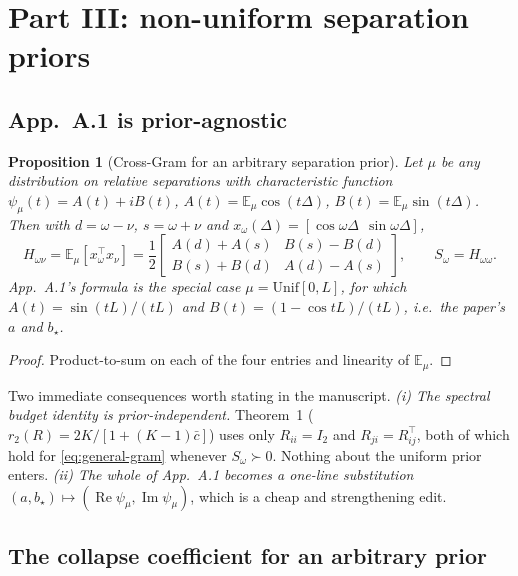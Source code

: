 \documentclass[11pt]{article}
\newtheorem{proposition}[theorem]{Proposition}
\theoremstyle{definition}
\newcommand{\E}{\mathbb{E}}
\begin{document}
\section{Part III: non-uniform separation priors}
\label{sec:prior}

\subsection{App.~A.1 is prior-agnostic}

\begin{proposition}[Cross-Gram for an arbitrary separation prior]\label{prop:cross-gram}
Let $\mu$ be any distribution on relative separations with characteristic function
$\psi_\mu(t)=A(t)+iB(t)$, $A(t)=\E_\mu\cos(t\Delta)$, $B(t)=\E_\mu\sin(t\Delta)$. Then with
$d=\omega-\nu$, $s=\omega+\nu$ and $x_\omega(\Delta)=[\cos\omega\Delta\ \ \sin\omega\Delta]$,
\begin{equation}
H_{\omega\nu}=\E_\mu[x_\omega^\top x_\nu]=\frac12
\begin{bmatrix} A(d)+A(s) & B(s)-B(d)\\ B(s)+B(d) & A(d)-A(s)\end{bmatrix},
\qquad S_\omega=H_{\omega\omega}.
\label{eq:general-gram}
\end{equation}
App.~A.1's formula is the special case $\mu=\mathrm{Unif}[0,L]$, for which
$A(t)=\sin(tL)/(tL)$ and $B(t)=(1-\cos tL)/(tL)$, i.e.\ the paper's $a$ and $b_\star$.
\end{proposition}
\begin{proof}
Product-to-sum on each of the four entries and linearity of $\E_\mu$.
\end{proof}

Two immediate consequences worth stating in the manuscript.
\emph{(i) The spectral budget identity is prior-independent.} Theorem~1
($r_2(R)=2K/[1+(K-1)\bar c]$) uses only $R_{ii}=I_2$ and $R_{ji}=R_{ij}^\top$, both of which hold
for \eqref{eq:general-gram} whenever $S_\omega\succ0$. Nothing about the uniform prior enters.
\emph{(ii) The whole of App.~A.1 becomes a one-line substitution}
$(a,b_\star)\mapsto(\operatorname{Re}\psi_\mu,\operatorname{Im}\psi_\mu)$, which is a cheap and
strengthening edit.

\subsection{The collapse coefficient for an arbitrary prior}
\end{document}
